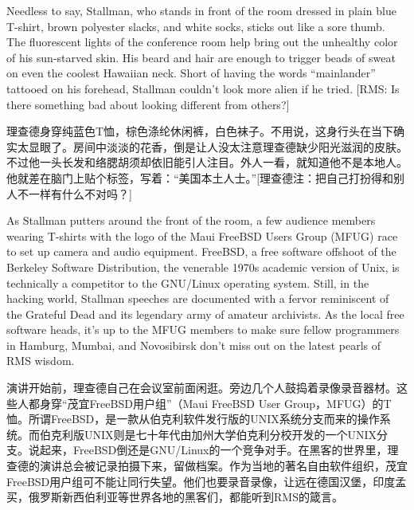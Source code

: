 \ifdefined\eng
Needless to say, Stallman, who stands in front of the room dressed in plain blue T-shirt, brown polyester slacks, and white socks, sticks out like a sore thumb. The fluorescent lights of the conference room help bring out the unhealthy color of his sun-starved skin.  His beard and hair are enough to trigger beads of sweat on even the coolest Hawaiian neck. Short of having the words ``mainlander'' tattooed on his forehead, Stallman couldn't look more alien if he tried. [RMS: Is there something bad about looking different from others?]
\fi

\ifdefined\chs
理查德身穿纯蓝色T恤，棕色涤纶休闲裤，白色袜子。不用说，这身行头在当下确实太显眼了。房间中淡淡的花香，倒是让人没太注意理查德缺少阳光滋润的皮肤。不过他一头长发和络腮胡须却依旧能引人注目。外人一看，就知道他不是本地人。他就差在脑门上贴个标签，写着：“美国本土人士。”[理查德注：把自己打扮得和别人不一样有什么不对吗？]
\fi

\ifdefined\eng
As Stallman putters around the front of the room, a few audience members wearing T-shirts with the logo of the Maui FreeBSD Users Group (MFUG) race to set up camera and audio equipment. FreeBSD, a free software offshoot of the Berkeley Software Distribution, the venerable 1970s academic version of Unix, is technically a competitor to the GNU/Linux operating system. Still, in the hacking world, Stallman speeches are documented with a fervor reminiscent of the Grateful Dead and its legendary army of amateur archivists. As the local free software heads, it's up to the MFUG members to make sure fellow programmers in Hamburg, Mumbai, and Novosibirsk don't miss out on the latest pearls of RMS wisdom.
\fi

\ifdefined\chs
演讲开始前，理查德自己在会议室前面闲逛。旁边几个人鼓捣着录像录音器材。这些人都身穿“茂宜FreeBSD用户组”（Maui FreeBSD User Group，MFUG）的T恤。所谓FreeBSD，是一款从伯克利软件发行版的UNIX系统分支而来的操作系统。而伯克利版UNIX则是七十年代由加州大学伯克利分校开发的一个UNIX分支。说起来，FreeBSD倒还是GNU/Linux的一个竞争对手。在黑客的世界里，理查德的演讲总会被记录拍摄下来，留做档案。作为当地的著名自由软件组织，茂宜FreeBSD用户组可不能让同行失望。他们也要录音录像，让远在德国汉堡，印度孟买，俄罗斯新西伯利亚等世界各地的黑客们，都能听到RMS的箴言。
\fi

